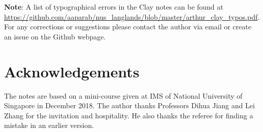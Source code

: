 \documentclass[11pt]{amsart}
\theoremstyle{remark}
\begin{document}
\textbf{Note}: A list of typographical errors in the Clay notes can be found at \url{https://github.com/aaparab/nus_langlands/blob/master/arthur_clay_typos.pdf}. For any corrections or suggestions please contact the author via email or create an issue on the Github webpage. 

\section*{Acknowledgements}
The notes are based on a mini-course given at IMS of National University of Singapore in December 2018. The author thanks Professors Dihua Jiang and Lei Zhang for the invitation and hospitality. He also thanks the referee for finding a mistake in an earlier version.


{}

\end{document}
